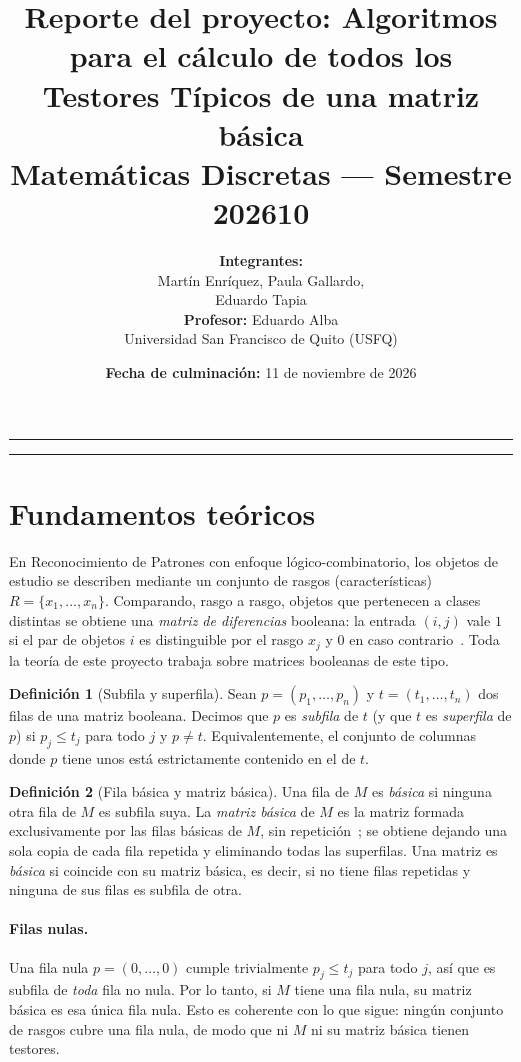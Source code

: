 \documentclass[11pt, a4paper]{article}
\title{\vspace{-1cm}\Huge\textbf{Reporte del proyecto: Algoritmos para el cálculo de todos los Testores Típicos de una matriz básica}\\[0.3cm]\Large Matemáticas Discretas --- Semestre 202610}
\author{\textbf{Integrantes:}\\
    Martín Enríquez, Paula Gallardo,\\
    Eduardo Tapia\\[0.1cm]
    \textbf{Profesor:} Eduardo Alba\\
    Universidad San Francisco de Quito (USFQ)}
\date{\textbf{Fecha de culminación:} 11 de noviembre de 2026}
\theoremstyle{definition}
\newtheorem{definicion}{Definición}
\theoremstyle{plain}
\newcommand{\x}[1]{x_{#1}}
\begin{document}
\maketitle
\thispagestyle{fancy}

\hrule
\vspace{0.3cm}
\tableofcontents
\vspace{0.3cm}
\hrule

\section{Fundamentos teóricos}

En Reconocimiento de Patrones con enfoque lógico-combinatorio, los objetos de
estudio se describen mediante un conjunto de rasgos (características)
$R=\{\x1,\dots,\x n\}$. Comparando, rasgo a rasgo, objetos que pertenecen a
clases distintas se obtiene una \emph{matriz de diferencias} booleana: la
entrada $(i,j)$ vale $1$ si el par de objetos $i$ es distinguible por el rasgo
$\x j$ y $0$ en caso contrario~\cite{lazo2001}. Toda la teoría de este proyecto
trabaja sobre matrices booleanas de este tipo.

\begin{definicion}[Subfila y superfila]
Sean $p=(p_1,\dots,p_n)$ y $t=(t_1,\dots,t_n)$ dos filas de una matriz booleana.
Decimos que $p$ es \emph{subfila} de $t$ (y que $t$ es \emph{superfila} de $p$) si
$p_j \le t_j$ para todo $j$ y $p\neq t$. Equivalentemente, el conjunto de columnas
donde $p$ tiene unos está estrictamente contenido en el de $t$.
\end{definicion}

\begin{definicion}[Fila básica y matriz básica]
Una fila de $M$ es \emph{básica} si ninguna otra fila de $M$ es subfila
suya. La \emph{matriz básica} de $M$ es la matriz formada exclusivamente por las
filas básicas de $M$, sin repetición~\cite{algobt,yyc2014}; se obtiene dejando
una sola copia de cada fila repetida y eliminando todas las superfilas. Una
matriz es \emph{básica} si coincide con su matriz básica, es decir, si no tiene
filas repetidas y ninguna de sus filas es subfila de otra.
\end{definicion}

\paragraph{Filas nulas.} Una fila nula $p=(0,\dots,0)$ cumple trivialmente
$p_j\le t_j$ para todo $j$, así que es subfila de \emph{toda} fila no nula.
Por lo tanto, si $M$ tiene una fila nula, su matriz básica es esa única fila
nula. Esto es coherente con lo que sigue: ningún conjunto de rasgos cubre una
fila nula, de modo que ni $M$ ni su matriz básica tienen testores.
\end{document}
